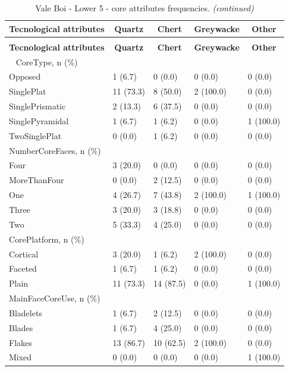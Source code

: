 \documentclass[12pt,twoside]{reedthesis}
\begin{document}
\begingroup\fontsize{9}{11}\selectfont
\begin{longtable}[t]{lllll}
\caption{\label{tab:coreattributesVB1}Vale Boi - Lower 5 - core attributes frequencies.}\\
\toprule
\multicolumn{1}{c}{\textbf{Tecnological attributes}} & \multicolumn{1}{c}{\textbf{Quartz}} & \multicolumn{1}{c}{\textbf{Chert}} & \multicolumn{1}{c}{\textbf{Greywacke}} & \multicolumn{1}{c}{\textbf{Other}}\\
\midrule
\endfirsthead
\caption[]{\label{tab:coreattributesVB1}Vale Boi - Lower 5 - core attributes frequencies. \textit{(continued)}}\\
\toprule
\multicolumn{1}{c}{\textbf{Tecnological attributes}} & \multicolumn{1}{c}{\textbf{Quartz}} & \multicolumn{1}{c}{\textbf{Chert}} & \multicolumn{1}{c}{\textbf{Greywacke}} & \multicolumn{1}{c}{\textbf{Other}}\\
\midrule
\endhead
\
\endfoot
\bottomrule
\endlastfoot
CoreType, n (\%) &  &  &  & \\
Opposed & 1 (6.7) & 0 (0.0) & 0 (0.0) & 0 (0.0)\\
SinglePlat & 11 (73.3) & 8 (50.0) & 2 (100.0) & 0 (0.0)\\
SinglePrismatic & 2 (13.3) & 6 (37.5) & 0 (0.0) & 0 (0.0)\\
SinglePyramidal & 1 (6.7) & 1 (6.2) & 0 (0.0) & 1 (100.0)\\
\addlinespace
TwoSinglePlat & 0 (0.0) & 1 (6.2) & 0 (0.0) & 0 (0.0)\\
NumberCoreFaces, n (\%) &  &  &  & \\
Four & 3 (20.0) & 0 (0.0) & 0 (0.0) & 0 (0.0)\\
MoreThanFour & 0 (0.0) & 2 (12.5) & 0 (0.0) & 0 (0.0)\\
One & 4 (26.7) & 7 (43.8) & 2 (100.0) & 1 (100.0)\\
\addlinespace
Three & 3 (20.0) & 3 (18.8) & 0 (0.0) & 0 (0.0)\\
Two & 5 (33.3) & 4 (25.0) & 0 (0.0) & 0 (0.0)\\
CorePlatform, n (\%) &  &  &  & \\
Cortical & 3 (20.0) & 1 (6.2) & 2 (100.0) & 0 (0.0)\\
Faceted & 1 (6.7) & 1 (6.2) & 0 (0.0) & 0 (0.0)\\
\addlinespace
Plain & 11 (73.3) & 14 (87.5) & 0 (0.0) & 1 (100.0)\\
MainFaceCoreUse, n (\%) &  &  &  & \\
Bladelets & 1 (6.7) & 2 (12.5) & 0 (0.0) & 0 (0.0)\\
Blades & 1 (6.7) & 4 (25.0) & 0 (0.0) & 0 (0.0)\\
Flakes & 13 (86.7) & 10 (62.5) & 2 (100.0) & 0 (0.0)\\
\addlinespace
Mixed & 0 (0.0) & 0 (0.0) & 0 (0.0) & 1 (100.0)\\*
\end{longtable}
\endgroup{}
\end{document}

